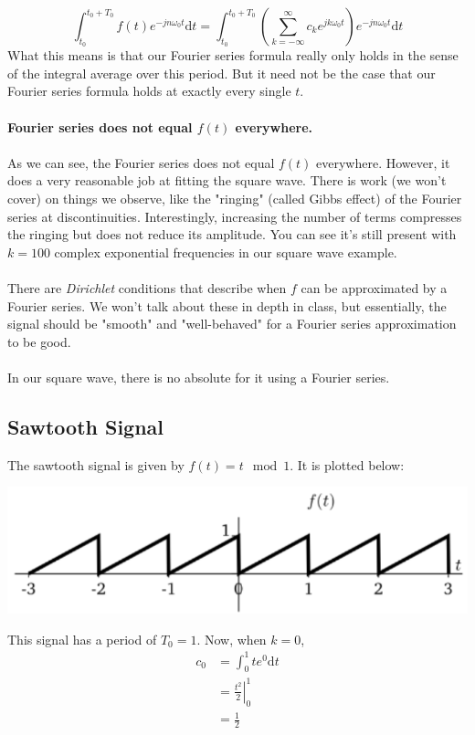 \documentclass[10pt]{article}
\begin{document}
\[\int_{t_0}^{t_0 + T_0} f(t) e^{-jn\omega_0 t} \text{d}t = \int_{t_0}^{t_0 + T_0} \left(\sum_{k = -\infty}^\infty c_k e^{jk\omega_0 t}\right) e^{-jn\omega_0 t}\text{d}t\]
What this means is that our Fourier series formula really only holds in the sense of the integral average over this period.  But it need not be the case that our Fourier series formula holds at exactly every single $t$.\\\\
\textbf{Fourier series does not equal $f(t)$ everywhere.}\\\\
As we can see, the Fourier series does not equal $f(t)$ everywhere.  However, it does a very reasonable job at fitting the square wave. There is work (we won't cover) on things we observe, like the "ringing" (called Gibbs effect) of the Fourier series at discontinuities. Interestingly, increasing the number of terms compresses the ringing but does not reduce its amplitude. You can see it's still present with $k = 100$ complex exponential frequencies in our square wave example.\\\\
There are \textit{Dirichlet} conditions that describe when $f$ can be approximated by a Fourier series. We won't talk about these in depth in class, but essentially, the signal should be "smooth" and "well-behaved" for a Fourier series approximation to be good.\\\\
In our square wave, there is no absolute for it using a Fourier series.

\subsection*{Sawtooth Signal}
The sawtooth signal is given by $f(t) = t \mod 1$.  It is plotted below:
\begin{center}
    \includegraphics[scale=0.9]{W4_13.png}
\end{center}
This signal has a period of $T_0 = 1$.  Now, when $k = 0$,
\begin{align*}
    c_0 &= \int_0^1 te^0 \text{d}t\\
    &= \left.\frac{t^2}{2}\right|_0^1\\
    &= \frac{1}{2}
\end{align*}
\end{document}
